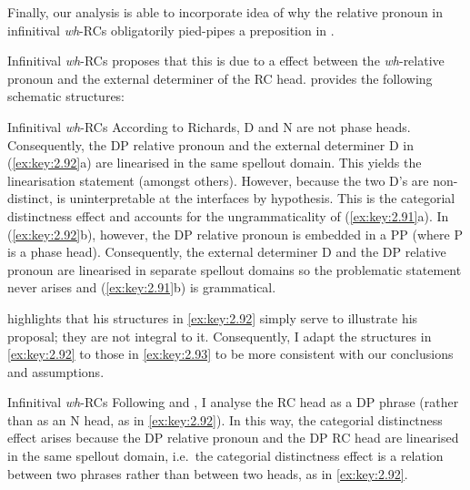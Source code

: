 \documentclass[output=paper]{langsci/langscibook}
\begin{document}
Finally, our analysis is able to incorporate  idea of why
the relative pronoun in infinitival
\emph{wh}-\glspl{RC} obligatorily pied-pipes a preposition in
.

\ea\label{ex:key:2.91} Infinitival \emph{wh}-\glspl{RC}
    \z
\z
\textcite{Richards2010} proposes that this is due to a  effect between the \emph{wh}{-relative pronoun and the external
determiner of the RC head.} \textcite[35]{Richards2010} provides the following
schematic structures:

\ea\label{ex:key:2.92} Infinitival \emph{wh}-\glspl{RC}
    \z
\z
According to Richards, D and N are not phase heads. Consequently, the DP
relative pronoun and the external determiner D in (\ref{ex:key:2.92}a) are
linearised in the same spellout domain. This yields the linearisation statement
 (amongst others). However, because the two D’s are non-distinct,
 is uninterpretable at the interfaces by hypothesis. This is the
categorial distinctness effect and accounts for the ungrammaticality of
(\ref{ex:key:2.91}a). In (\ref{ex:key:2.92}b), however, the DP relative pronoun
is embedded in a PP (where P is a phase head).  Consequently, the external
determiner D and the DP relative pronoun are linearised in separate spellout
domains so the problematic  statement never arises and
(\ref{ex:key:2.91}b) is grammatical.

\textcite{Richards2010} highlights that his structures in \eqref{ex:key:2.92}
simply serve to illustrate his proposal; they are not integral to it.
Consequently, I adapt the structures in \eqref{ex:key:2.92} to those in
\eqref{ex:key:2.93} to be more consistent with our conclusions and assumptions.

\ea\label{ex:key:2.93} Infinitival \emph{wh}-\glspl{RC}
    \z
\z
Following \textcite{Borsley1997} and \textcite{Bianchi2000}, I analyse the
\gls{RC} head as a DP phrase (rather than as an N head, as
in \eqref{ex:key:2.92}). In this way, the categorial distinctness effect arises
because the DP relative pronoun and the DP \gls{RC} head
are linearised in the same spellout domain, i.e.\ the categorial distinctness
effect is a relation between two phrases rather than between two heads, as in
\eqref{ex:key:2.92}.
\end{document}
